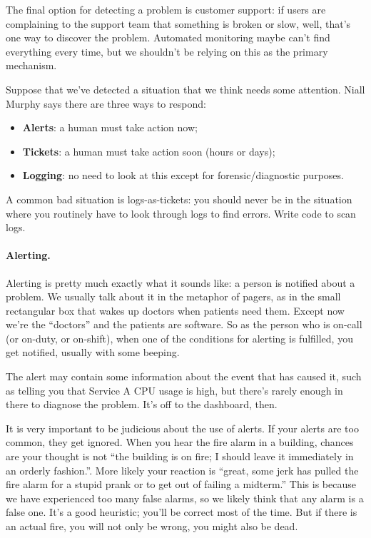 The final option for detecting a problem is customer support: if users are complaining to the support team that something is broken or slow, well, that's one way to discover the problem. Automated monitoring maybe can't find everything every time, but we shouldn't be relying on this as the primary mechanism.

Suppose that we've detected a situation that we think needs some attention. Niall Murphy says there are three ways to respond:

\begin{itemize}
\item {\bf Alerts}: a human must take action now;
\item {\bf Tickets}: a human must take action soon (hours or days);
\item {\bf Logging}: no need to look at this except for forensic/diagnostic purposes.
\end{itemize}

A common bad situation is logs-as-tickets: you should never be in the
situation where you routinely have to look through logs to find
errors. Write code to scan logs.

\paragraph{Alerting.}
Alerting is pretty much exactly what it sounds like: a person is notified about a problem. We usually talk about it in the metaphor of pagers, as in the small rectangular box that wakes up doctors when patients need them. Except now we're the ``doctors'' and the patients are software. So as the person who is on-call (or on-duty, or on-shift), when one of the conditions for alerting is fulfilled, you get notified, usually with some beeping. 

The alert may contain some information about the event that has caused it, such as telling you that Service A CPU usage is high, but there's rarely enough in there to diagnose the problem. It's off to the dashboard, then.

It is very important to be judicious about the use of alerts. If your alerts are too common, they get ignored. When you hear the fire alarm in a building, chances are your thought is not ``the building is on fire; I should leave it immediately in an orderly fashion.''. More likely your reaction is ``great, some jerk has pulled the fire alarm for a stupid prank or to get out of failing a midterm.'' This is because we have experienced too many false alarms, so we likely think that any alarm is a false one. It's a good heuristic; you'll be correct most of the time. But if there is an actual fire, you will not only be wrong, you might also be dead.

